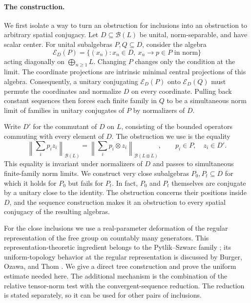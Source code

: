 \documentclass[11pt]{article}
\theoremstyle{definition}
\theoremstyle{remark}
\newcommand{\B}{\mathcal B}
\newcommand{\E}{\mathcal E}
\newcommand{\norm}[1]{\left\|#1\right\|}
\begin{document}
\paragraph{The construction.}
We first isolate a way to turn an obstruction for inclusions into an
obstruction to arbitrary spatial conjugacy. Let $D\subseteq\B(L)$ be unital,
norm-separable, and have scalar center. For unital subalgebras $P,Q\subseteq D$,
consider the algebra
\[
\E_D(P)=\{(x_n):x_n\in D,\ x_n\longrightarrow p\in P
\text{ in norm}\}
\]
acting diagonally on $\bigoplus_{n\ge1}L$. Changing $P$ changes only the
condition at the limit. The coordinate projections are intrinsic minimal
central projections of this algebra. Consequently, a unitary conjugating
$\E_D(P)$ onto $\E_D(Q)$ must permute the coordinates and normalize $D$
on every coordinate. Pulling back constant sequences then forces each
finite family in $Q$ to be a simultaneous norm limit of families in
unitary conjugates of $P$ by normalizers of $D$.

Write $D'$ for the commutant of $D$ on $L$, consisting of the bounded
operators commuting with every element of $D$. The obstruction we use is
the equality
\begin{equation}\label{eq:intro-test}
\norm{\sum_i p_i z_i}_{\B(L)}
=\norm{\sum_i p_i\otimes z_i}_{\B(L\otimes L)},
\qquad p_i\in P,\quad z_i\in D'.
\end{equation}
This equality is invariant under normalizers of $D$ and passes to
simultaneous finite-family norm limits. We construct very close subalgebras
$P_0,P_t\subseteq D$ for which it holds for $P_0$ but fails for $P_t$.
In fact, $P_0$ and $P_t$ themselves are conjugate by a unitary close to the
identity. The obstruction concerns their positions inside $D$, and the
sequence construction makes it an obstruction to every spatial conjugacy
of the resulting algebras.

For the close inclusions we use a real-parameter deformation of the regular
representation of the free group on countably many generators. This
representation-theoretic ingredient belongs to the Pytlik--Szwarc family
\cite{PS86}; its uniform-topology behavior at the regular representation
is discussed by Burger, Ozawa, and Thom \cite[Theorem~4.6]{BOT13}.
We give a direct tree construction and prove the uniform estimate needed
here. The additional mechanism is the combination of the relative
tensor-norm test with the convergent-sequence reduction. The reduction is
stated separately, so it can be used for other pairs of inclusions.
\end{document}
